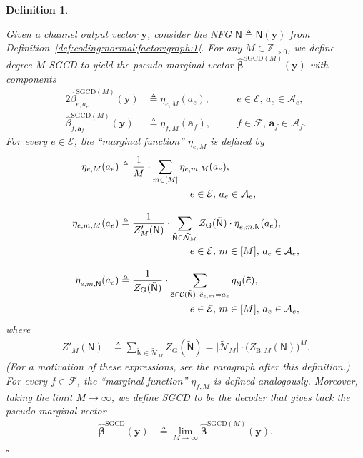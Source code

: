 \documentclass[journal, twocolumn]{IEEEtran}
\renewcommand{\mathbf}[1]{{\bm{#1}}}
\newcommand{\Z}{\mathbb{Z}}
\newcommand{\Zpp}{\Z_{>0}}
\newcommand{\vect}[1]{\mathbf{#1}}
\newcommand{\code}[1]{\mathcal{#1}}
\newcommand{\set}[1]{\mathcal{#1}}
\newcommand{\graph}[1]{\mathsf{#1}}
\newcommand{\defeq}{\triangleq}
\newcommand{\codeC}{\code{C}}
\newcommand{\bel}{\beta}
\newcommand{\hbel}{\hat \bel}
\newcommand{\hvbel}{\boldsymbol{\hat \bel}}
\newcommand{\setA}{\set{A}}
\newcommand{\setE}{\set{E}}
\newcommand{\setF}{\set{F}}
\newcommand{\SGCD}{\mathrm{SGCD}}
\newcommand{\va}{\vect{a}}
\newcommand{\cvc}{\vect{\cover{c}}}
\newcommand{\vy}{\vect{y}}
\newcommand{\graphN}{\graph{N}}
\newcommand{\ZBetheM}[1]{Z_{\mathrm{B}, #1}}
\newcommand{\cover}[1]{\tilde{#1}}
\newcommand{\cset}[1]{\cover{\set{#1}}}
\newcommand{\cgraph}[1]{\cover{\graph{#1}}}
\newcommand{\cardbig}[1]{\big\lvert #1 \big\rvert}
\newcommand{\?}{\mathrm{?}}
\newcommand{\qedwhite}{\hspace*{\fill}%
  $\square$\smallskip}
\newcommand{\defend}{\qedwhite}
\newcommand{\ZGibbsext}[1]{Z_{\mathrm{G}}(#1)}
\newtheorem{Definition}[Lemma]{Definition}
\begin{document}
\begin{Definition}
  \label{def:SGCD:1}
  
  Given a channel output vector $\vy$, consider the NFG
  $\graphN \defeq \graphN(\vy)$ from
  Definition~\ref{def:coding:normal:factor:graph:1}. For any $M \in \Zpp$, we
  define degree-$M$ SGCD to yield the pseudo-marginal vector
  $\hvbel^{\SGCD(M)}(\vy)$ with components
  \begin{alignat*}{2}
    \hbel_{e,a_e}^{\SGCD(M)}(\vy)
      &\defeq
         \eta_{e,M}(a_e),
           &\quad& e \in \setE, \, a_e \in \setA_e, \\
    \hbel_{f,\va_f}^{\SGCD(M)}(\vy)
      &\defeq
         \eta_{f,M}(\va_f),
           &\quad& f \in \setF, \, \va_f \in \setA_f.
  \end{alignat*}
  For every $e \in \setE$, the ``marginal function'' $\eta_{e,M}$ is 
  defined by
  \begin{align*}
    \eta_{e,M}(a_e)
      &\defeq
         \frac{1}{M}
         \cdot
         \sum_{m \in [M]}
           \eta_{e,m,M}(a_e), \\
      &\hskip2.5cm
             e \in \setE, \, a_e \in \setA_e, \\[0.3cm]
    \eta_{e,m,M}(a_e)
      &\defeq
         \frac{1}{Z'_M(\graphN)}
         \cdot
         \sum_{\cgraph{N} \in \cset{N}_M}
           \ZGibbsext{\cgraph{N}}
           \cdot
           \eta_{e,m,\cgraph{N}}(a_e), \\
      &\hskip2.5cm
             e \in \setE, \, m \in [M], \, a_e \in \setA_e, \\[0.3cm]
    \eta_{e,m,\cgraph{N}}(a_e)
      &\defeq
         \frac{1}{\ZGibbsext{\cgraph{N}}}
         \cdot
         \sum_{\cvc \in \codeC(\cgraph{N}): \, \cover{c}_{e,m} = a_e}
           g_{\cgraph{N}}(\cvc), \\
      &\hskip2.5cm
             e \in \setE, \, m \in [M], \, a_e \in \setA_e,
  \end{align*}
  where
  \begin{align}
    Z'_M(\graphN)
      &\defeq
         \sum_{\cgraph{N} \in \cset{N}_M}
           \ZGibbsext{\cgraph{N}}
       = \cardbig{\cset{N}_M} 
         \cdot
         \big( \ZBetheM{M}(\graphN) \big)^M.
           \label{eq:Z:M:def:1}
  \end{align}
  (For a motivation of these expressions, see the paragraph after this
  definition.) For every $f \in \setF$, the ``marginal function'' $\eta_{f,M}$
  is defined analogously. Moreover, taking the limit $M \to \infty$, we define
  SGCD to be the decoder that gives back the pseudo-marginal vector
  \begin{align*}
    \hvbel^{\SGCD}(\vy)
      &\defeq
         \lim_{M \to \infty}
           \hvbel^{\SGCD(M)}(\vy).
  \end{align*}
  \defend
\end{Definition}
\end{document}
